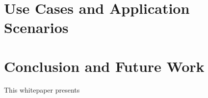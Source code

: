 \documentclass{llncs}
\begin{document}
{	

	
	\section{Use Cases and Application Scenarios}
		\label{s:section-5}	
	
	

	\section{Conclusion and Future Work}
		\label{s:section-6}	




		This whitepaper presents

}
\end{document}
